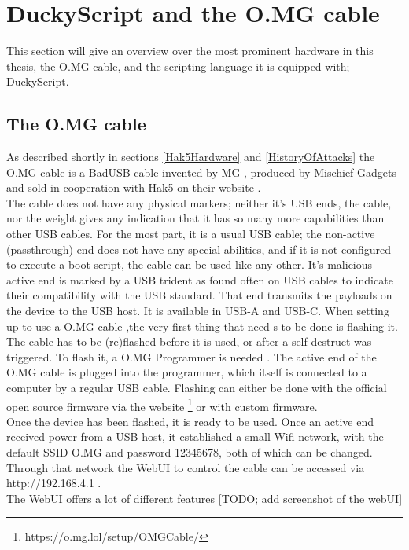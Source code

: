 \section{DuckyScript and the O.MG cable}


This section will give an overview over the most prominent hardware in this thesis, the O.MG cable, and the scripting language it is equipped with; DuckyScript. 

\subsection{The O.MG cable}

As described shortly in sections \ref{Hak5Hardware} and \ref{HistoryOfAttacks} the O.MG cable is a BadUSB cable invented by MG \cite{MGCable2019a}, produced by Mischief Gadgets \cite{hak5MischiefGadgets} and sold in cooperation with Hak5 on their website \cite{hak5MischiefGadgets}. \\
The cable does not have any physical markers; neither it's USB ends, the cable, nor the weight gives any indication that it has so many more capabilities than other USB cables. For the most part, it is a usual USB cable; the non-active (passthrough) end does not have any special abilities, and if it is not configured to execute a boot script, the cable can be used like any other. It's malicious active end is marked by a USB trident as found often on USB cables to indicate their compatibility with the USB standard. That end transmits the payloads on the device to the USB host. It is available in USB-A and USB-C.
When setting up to use a O.MG cable ,the very first thing that need s to be done is flashing it. The cable has to be (re)flashed before it is used, or after a self-destruct was triggered. To flash it, a O.MG Programmer is needed \cite{hak5MGCable}. The active end of the O.MG cable is plugged into the programmer, which itself is connected to a computer by a regular USB cable. Flashing can either be done with the official open source firmware \cite{DuckyScriptSyntaxGuide} via the website \footnote{https://o.mg.lol/setup/OMGCable/} or with custom firmware. \\  
Once the device has been flashed, it is ready to be used. Once an active end received power from a USB host, it established a small Wifi network, with the default SSID O.MG and password 12345678, both of which can be changed. Through that network the WebUI to control the cable can be accessed via http://192.168.4.1 . \\
The WebUI offers a lot of different features [TODO; add screenshot of the webUI]

